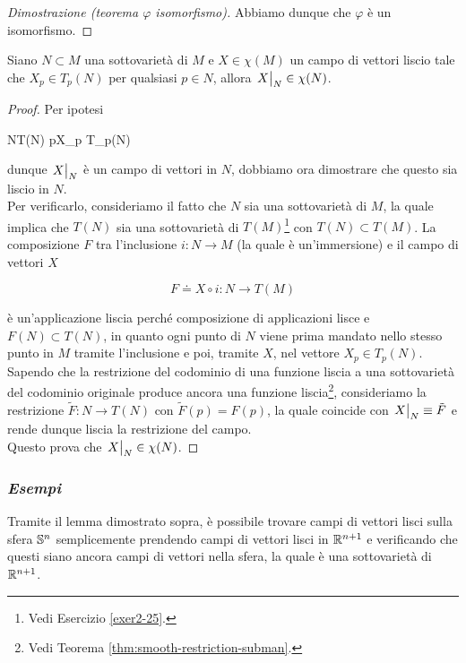 \begin{proof}[Dimostrazione (teorema $ \varphi $ isomorfismo)]
Abbiamo dunque che $ \varphi $ è un isomorfismo.
\end{proof}

\begin{lemma}\label{lemma:chi-subman-restr}
	Siano $ N \subset M $ una sottovarietà di $ M $ e $ X \in \chi(M) $ un campo di vettori liscio tale che $ X_{p} \in T_{p}(N) $ per qualsiasi $ p \in N $, allora $ \eval{X}_{N} \in \chi(N) $.
\end{lemma}

\begin{proof}
	Per ipotesi
	
		{N}{T(N)}
		{p}{X_{p} \in T_{p}(N)}
	
	dunque $ \eval{X}_{N} $ è un campo di vettori in $ N $, dobbiamo ora dimostrare che questo sia liscio in $ N $. \\
	Per verificarlo, consideriamo il fatto che $ N $ sia una sottovarietà di $ M $, la quale implica che $ T(N) $ sia una sottovarietà di $ T(M) $\footnote{%
		Vedi Esercizio \ref{exer2-25}.%
	} con $ T(N) \subset T(M) $. La composizione $ F $ tra l'inclusione $ i : N \to M $ (la quale è un'immersione) e il campo di vettori $ X $

	\begin{equation}
		F \doteq X \circ i : N \to T(M)
	\end{equation}

	è un'applicazione liscia perché composizione di applicazioni lisce e $ F(N) \subset T(N) $, in quanto ogni punto di $ N $ viene prima mandato nello stesso punto in $ M $ tramite l'inclusione e poi, tramite $ X $, nel vettore $ X_{p} \in T_{p}(N) $. \\
	Sapendo che la restrizione del codominio di una funzione liscia a una sottovarietà del codominio originale produce ancora una funzione liscia\footnote{%
		Vedi Teorema \ref{thm:smooth-restriction-subman}.%
	}, consideriamo la restrizione $ \tilde{F} : N \to T(N) $ con $ \tilde{F}(p) = F(p) $, la quale coincide con $ \eval{X}_{N} \equiv \tilde{F} $ e rende dunque liscia la restrizione del campo. \\
	Questo prova che $ \eval{X}_{N} \in \chi(N) $.
\end{proof}

\subsubsection{\textit{Esempi}}

Tramite il lemma dimostrato sopra, è possibile trovare campi di vettori lisci sulla sfera $ \S^{n} $ semplicemente prendendo campi di vettori lisci in $ \R^{n+1} $ e verificando che questi siano ancora campi di vettori nella sfera, la quale è una sottovarietà di $ \R^{n+1} $.

